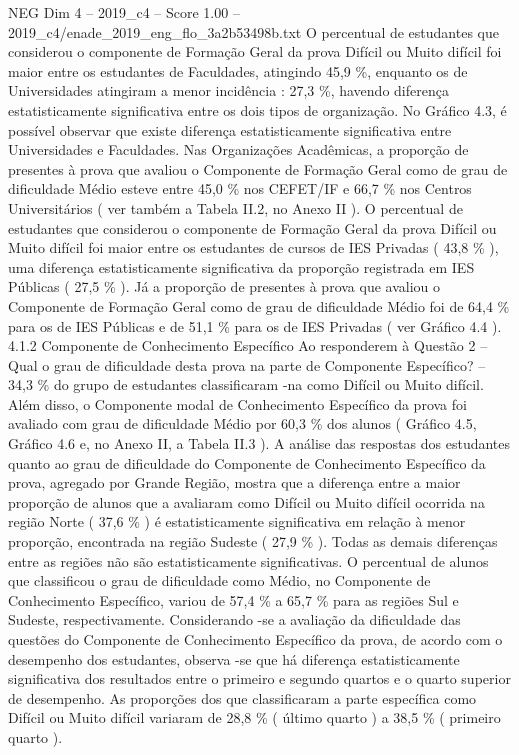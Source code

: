 \begin{textsample}{NEG Dim 4 – 2019\_c4 – Score 1.00 – 2019\_c4/enade\_2019\_eng\_flo\_3a2b53498b.txt}
O percentual de estudantes que considerou o componente de Formação Geral da prova Difícil ou Muito difícil foi maior entre os estudantes de Faculdades, atingindo 45,9 \%, enquanto os de Universidades atingiram a menor incidência : 27,3 \%, havendo diferença estatisticamente significativa entre os dois tipos de organização.
No Gráfico 4.3, é possível observar que existe diferença estatisticamente significativa entre Universidades e Faculdades.
Nas Organizações Acadêmicas, a proporção de presentes à prova que avaliou o Componente de Formação Geral como de grau de dificuldade Médio esteve entre 45,0 \% nos CEFET/IF e 66,7 \% nos Centros Universitários ( ver também a Tabela II.2, no Anexo II ).
O percentual de estudantes que considerou o componente de Formação Geral da prova Difícil ou Muito difícil foi maior entre os estudantes de cursos de IES Privadas ( 43,8 \% ), uma diferença estatisticamente significativa da proporção registrada em IES Públicas ( 27,5 \% ).
Já a proporção de presentes à prova que avaliou o Componente de Formação Geral como de grau de dificuldade Médio foi de 64,4 \% para os de IES Públicas e de 51,1 \% para os de IES Privadas ( ver Gráfico 4.4 ). 4.1.2 Componente de Conhecimento Específico Ao responderem à Questão 2 – Qual o grau de dificuldade desta prova na parte de Componente Específico? – 34,3 \% do grupo de estudantes classificaram -na como Difícil ou Muito difícil.
Além disso, o Componente modal de Conhecimento Específico da prova foi avaliado com grau de dificuldade Médio por 60,3 \% dos alunos ( Gráfico 4.5, Gráfico 4.6 e, no Anexo II, a Tabela II.3 ).
A análise das respostas dos estudantes quanto ao grau de dificuldade do Componente de Conhecimento Específico da prova, agregado por Grande Região, mostra que a diferença entre a maior proporção de alunos que a avaliaram como Difícil ou Muito difícil ocorrida na região Norte ( 37,6 \% ) é estatisticamente significativa em relação à menor proporção, encontrada na região Sudeste ( 27,9 \% ).
Todas as demais diferenças entre as regiões não são estatisticamente significativas.
O percentual de alunos que classificou o grau de dificuldade como Médio, no Componente de Conhecimento Específico, variou de 57,4 \% a 65,7 \% para as regiões Sul e Sudeste, respectivamente.
Considerando -se a avaliação da dificuldade das questões do Componente de Conhecimento Específico da prova, de acordo com o desempenho dos estudantes, observa -se que há diferença estatisticamente significativa dos resultados entre o primeiro e segundo quartos e o quarto superior de desempenho.
As proporções dos que classificaram a parte específica como Difícil ou Muito difícil variaram de 28,8 \% ( último quarto ) a 38,5 \% ( primeiro quarto ).

\end{textsample}
